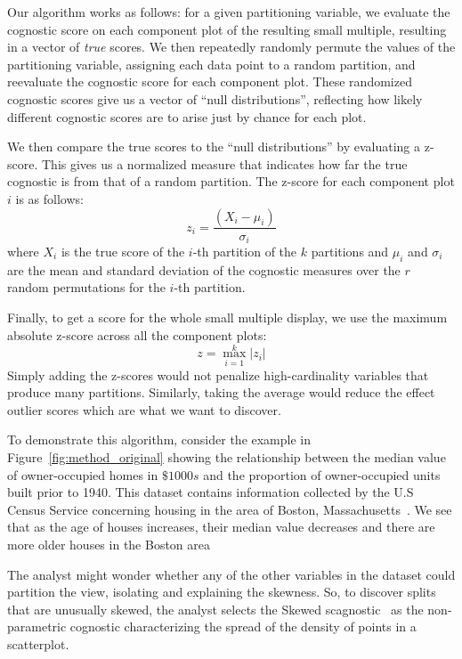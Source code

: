 Our algorithm works as follows: for a given partitioning variable, we evaluate the cognostic score on each component plot of the resulting small multiple, resulting in a vector of \emph{true} scores. We then repeatedly randomly permute the values of the partitioning variable, assigning each data point to a random partition, and reevaluate the cognostic score for each component plot. These randomized cognostic scores give us a vector of ``null distributions'', reflecting how likely different cognostic scores are to arise just by chance for each plot.

We then compare the true scores to the ``null distributions'' by evaluating a z-score. This gives us a normalized measure that indicates how far the true cognostic is from that of a random partition. The z-score for each component plot $i$ is as follows:
$$z_i = \frac{(X_i-\mu_i)}{\sigma_i}$$ 
where $X_i$ is the true score of the $i$-th partition of the $k$ partitions and $\mu_i$ and $\sigma_i$ are the mean and standard deviation of the cognostic measures over the $r$ random permutations for the $i$-th partition.

Finally, to get a score for the whole small multiple display, we use the maximum absolute z-score across all the component plots: 
$$z = \max_{i=1}^k |z_i|$$ 
Simply adding the z-scores would not penalize high-cardinality variables that produce many partitions. Similarly, taking the average would reduce the effect outlier scores which are what we want to discover.

To demonstrate this algorithm, consider the example in Figure~\ref{fig:method_original} showing the relationship between the median value of owner-occupied homes in $\$1000s$ and the proportion of owner-occupied units built prior to 1940. This dataset contains information collected by the U.S Census Service concerning housing in the area of Boston, Massachusetts~\cite{Harrison1978}. We see that as the age of houses increases, their median value decreases and there are more older houses in the Boston area

The analyst might wonder whether any of the other variables in the dataset could partition the view, isolating and explaining the skewness. So, to discover splits that are unusually skewed, the analyst selects the Skewed scagnostic~\cite{Wilkinson2005} as the non-parametric cognostic characterizing the spread of the density of points in a scatterplot. 

